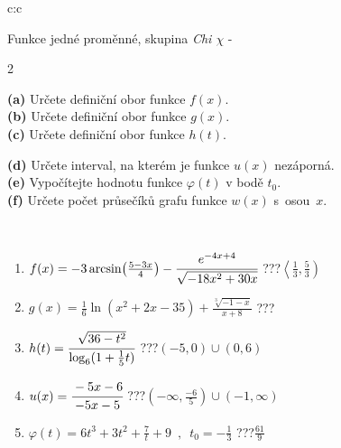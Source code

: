 \documentclass[10pt]{report}
\begin{document}
\begin{tabular}{c:c}
\begin{minipage}[c][104.5mm][t]{0.5\linewidth}
\begin{center}
\vspace{7mm}
{\huge Funkce jedné proměnné, skupina \textit{Chi $\chi$} -}\\[5mm]
\begin{minipage}{0.95\linewidth}
\begin{center}
{\small \begin{multicols}{2} \raggedright
\textbf{(a)} Určete definiční obor funkce \(f(x)\). \\[1mm]
\textbf{(b)} Určete definiční obor funkce \(g(x)\). \\[1mm]
\textbf{(c)} Určete definiční obor funkce \(h(t)\). \par \columnbreak
\textbf{(d)} Určete interval, na kterém je funkce \(u(x)\) nezáporná. \\[1mm]
\textbf{(e)} Vypočítejte hodnotu funkce \(\varphi(t)\) v bodě \(t_0\). \\[1mm]
\textbf{(f)} Určete počet průsečíků grafu funkce \(w(x)\) s~osou~\(x\). \\[1mm]
\end{multicols}
}
\end{center}
\end{minipage}
\\[4mm]
\begin{minipage}{0.79\linewidth}
\begin{center}
\begin{varwidth}{\linewidth}
\begin{enumerate}
\small
\item $f(x) = -3\arcsin\!\left( \frac{5-3x}{4} \right) - \cfrac{e^{-4x+4}}{\sqrt{-18x^2+30x}}$\quad \dotfill\; ???\;\dotfill \quad $\left\langle\frac{1}{3} , \frac{5}{3}\right)$
\item $g(x) = \frac{1}{6} \ln{\!(x^2+2x-35)}+\frac{\sqrt[3]{-1-x}}{x+8}$\quad \dotfill\; ???\;\dotfill {}
\item $h(t) = \cfrac{\sqrt{36-t^2}}{\log_6(1+\frac{1}{5}t)}$\quad \dotfill\; ???\;\dotfill \quad $\left(-5 , 0\right)\cup\left(0 , 6\right)$
\item $u(x) = \cfrac{-5x-6}{-5x-5}$\quad \dotfill\; ???\;\dotfill \quad $\left(-\infty , \frac{-6}{5}\right)\cup\left(-1 , \infty\right)$
\item $\varphi(t) = 6t^3+3t^2+\frac{7}{t}+9 \enspace , \enspace t_0=-\frac{1}{3}$\quad \dotfill\; ???\;\dotfill \quad $\frac{61}{9}$

\end{enumerate}
\end{varwidth}
\end{center}
\end{minipage}
\end{center}
\end{minipage}
\end{tabular}
\end{document}
